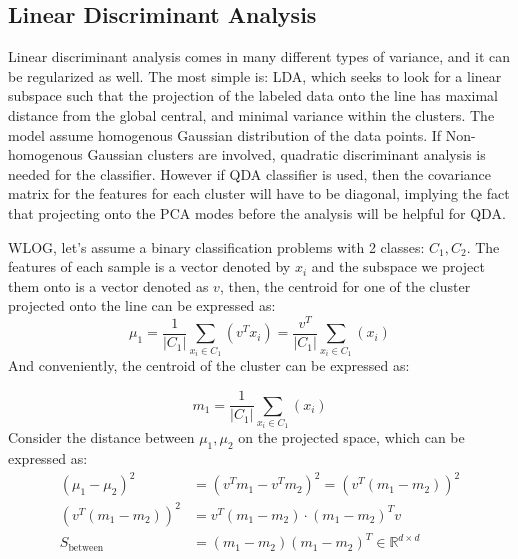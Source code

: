 \documentclass{article}
\begin{document}
    \subsection{Linear Discriminant Analysis}
        \hspace{1.1em}
        Linear discriminant analysis comes in many different types of variance, and it can be regularized as well. The most simple is: LDA, which seeks to look for a linear subspace such that the projection of the labeled data onto the line has maximal distance from the global central, and minimal variance within the clusters. The model assume homogenous Gaussian distribution of the data points. If Non-homogenous Gaussian clusters are involved, quadratic discriminant analysis is needed for the classifier. However if QDA classifier is used, then the covariance matrix for the features for each cluster will have to be diagonal, implying the fact that projecting onto the PCA modes before the analysis will be helpful for QDA.  
        \par
        WLOG, let's assume a binary classification problems with 2 classes: $C_1, C_2$. The features of each sample is a vector denoted by $x_i$ and the subspace we project them onto is a vector denoted as $v$, then, the centroid for one of the cluster projected onto the line can be expressed as:
        \begin{equation*}\tag{1}\label{eqn:1}
            \mu_1 = \frac{1}{|C_1|} \sum_{x_i \in C_1}^{}\left(
                v^Tx_i
            \right) = \frac{v^T}{|C_1|} \sum_{x_i\in C_1}^{}\left(
                x_i
            \right)
        \end{equation*}
        And conveniently, the centroid of the cluster can be expressed as: 
        \par
        \begin{equation*}\tag{2}\label{eqn:2}
            m_1 = \frac{1}{|C_1|} \sum_{x_i\in C_1}^{}\left(
                x_i
            \right)
        \end{equation*}
        Consider the distance between $\mu_1, \mu_2$ on the projected space, which can be expressed as: 
        \begin{align*}\tag{3}\label{eqn:3}
            (\mu_1 - \mu_2)^2 &= (v^Tm_1 - v^Tm_2)^2 = (v^T(m_1 - m_2))^2 
            \\
            (v^T(m_1 - m_2))^2  &= v^T(m_1 - m_2)\cdot (m_1 - m_2)^Tv
            \\
            S_\text{between} &= (m_1 - m_2)(m_1 - m_2)^T\in \mathbb{R}^{d\times d}
        \end{align*}
\end{document}
